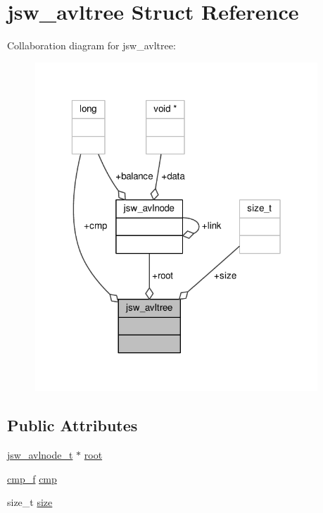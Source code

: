 \hypertarget{structjsw__avltree}{\section{jsw\-\_\-avltree Struct Reference}
\label{structjsw__avltree}
}


Collaboration diagram for jsw\-\_\-avltree\-:
\nopagebreak
\begin{figure}[H]
\begin{center}
\leavevmode
\includegraphics[width=301pt]{structjsw__avltree__coll__graph}
\end{center}
\end{figure}
\subsection*{Public Attributes}
\begin{DoxyCompactItemize}
\item 
\hyperlink{avltree_8c_a8d43f5292c3f20dae53793e7c3723f3b}{jsw\-\_\-avlnode\-\_\-t} $\ast$ \hyperlink{structjsw__avltree_af637498e51f5a46215736127701b2d6e}{root}
\item 
\hyperlink{avltree_8h_a2bc4e41c0905bb265a8a0240b76f011d}{cmp\-\_\-f} \hyperlink{structjsw__avltree_a0385af24ec6f7c5485d2354a8c4edc44}{cmp}
\item 
size\-\_\-t \hyperlink{structjsw__avltree_afcc98e7908ff3dbfd594599d2e1610be}{size}
\end{DoxyCompactItemize}


